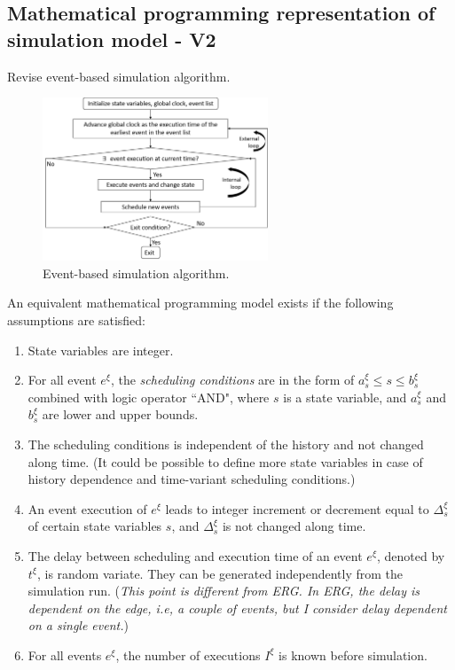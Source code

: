 \documentclass[]{interact}
\theoremstyle{plain}%
\theoremstyle{definition}
\theoremstyle{remark}
\begin{document}
\newpage
\subsection{Mathematical programming representation of simulation model - V2}

Revise event-based simulation algorithm.

\begin{figure}[h]
	\centering
	\includegraphics[width=0.6\textwidth]{Figures/EventSimAlgo.png}
	\caption{Event-based simulation algorithm.}
	\label{fig:EventSimAlgo}
\end{figure}

An equivalent mathematical programming model exists if the following assumptions are satisfied:
\begin{enumerate}
	\item State variables are integer.
	\item For all event $e^{\xi}$, the \textit{scheduling conditions} are in the form of $a^{\xi}_s\le s \le b^{\xi}_s$ combined with logic operator ``AND", where $s$ is a state variable, and $a^{\xi}_s$ and $b^{\xi}_s$ are lower and upper bounds.
	\item The scheduling conditions is independent of the history and not changed along time. (It could be possible to define more state variables in case of history dependence and time-variant scheduling conditions.)
	\item An event execution of $e^{\xi}$ leads to integer increment or decrement equal to $\Delta^{\xi}_s$ of certain state variables $s$, and $\Delta^{\xi}_s$ is not changed along time.
	\item The delay between scheduling and execution time of an event $e^{\xi}$, denoted by $t^{\xi}$, is random variate. They can be generated independently from the simulation run. (\textit{This point is different from ERG. In ERG, the delay is dependent on the edge, i.e, a couple of events, but I consider delay dependent on a single event.})
	\item For all events $e^{\xi}$, the number of executions $I^{\xi}$ is known before simulation.
\end{enumerate}
\end{document}
